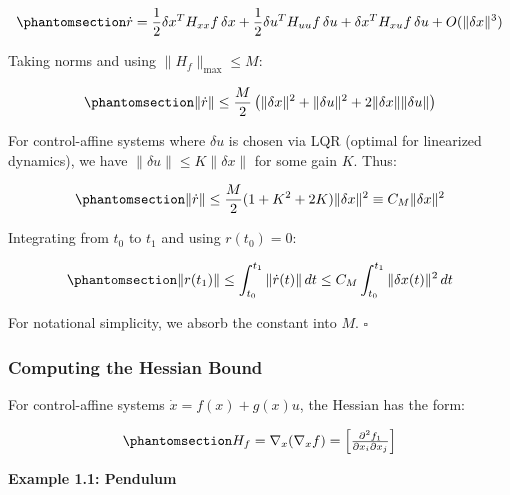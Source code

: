 \documentclass[
  letterpaper,
  DIV=11,
  numbers=noendperiod]{scrartcl}
\begin{document}
\begin{equation}\phantomsection\label{eq-residual-dynamics}{
\dot{r} = \frac{1}{2} \delta x^T H_{xx} f \, \delta x + \frac{1}{2} \delta u^T H_{uu} f \, \delta u + \delta x^T H_{xu} f \, \delta u + O(\|\delta x\|^3)
}\end{equation}

Taking norms and using \(\|H_f\|_{\max} \leq M\):

\begin{equation}\phantomsection\label{eq-residual-norm-bound}{
\| \dot{r} \| \leq \frac{M}{2} \left( \|\delta x\|^2 + \|\delta u\|^2 + 2\|\delta x\| \|\delta u\| \right)
}\end{equation}

For control-affine systems where \(\delta u\) is chosen via LQR (optimal
for linearized dynamics), we have \(\|\delta u\| \leq K \|\delta x\|\)
for some gain \(K\). Thus:

\begin{equation}\phantomsection\label{eq-residual-simplified}{
\| \dot{r} \| \leq \frac{M}{2} (1 + K^2 + 2K) \|\delta x\|^2 \equiv C_M \|\delta x\|^2
}\end{equation}

Integrating from \(t_0\) to \(t_1\) and using \(r(t_0) = 0\):

\begin{equation}\phantomsection\label{eq-residual-integral-bound}{
\| r(t_1) \| \leq \int_{t_0}^{t_1} \| \dot{r}(t) \| \, dt \leq C_M \int_{t_0}^{t_1} \|\delta x(t)\|^2 \, dt
}\end{equation}

For notational simplicity, we absorb the constant into \(M\).
\(\square\)

\subsubsection{Computing the Hessian
Bound}\label{computing-the-hessian-bound}

For control-affine systems \(\dot{x} = f(x) + g(x) u\), the Hessian has
the form:

\begin{equation}\phantomsection\label{eq-hessian-def}{
H_f = \nabla_x (\nabla_x f) = \begin{bmatrix} \frac{\partial^2 f_1}{\partial x_i \partial x_j} \end{bmatrix}
}\end{equation}

\textbf{Example 1.1: Pendulum}
\end{document}
